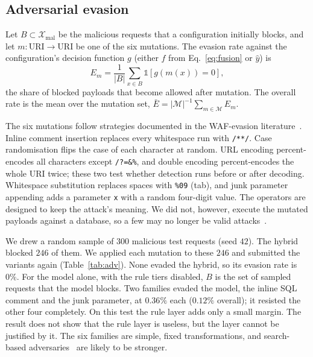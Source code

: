 \documentclass[preprint,11pt]{elsarticle}
\begin{document}
\subsection{Adversarial evasion}
Let $B\subset\mathcal{X}_{\text{mal}}$ be the malicious requests that a
configuration initially blocks, and let $m:\text{URI}\to\text{URI}$ be one
of the six mutations. The evasion rate against the configuration's decision
function $g$ (either $f$ from Eq.~\eqref{eq:fusion} or $\hat y$) is
\begin{equation}
E_m = \frac{1}{|B|}\sum_{x\in B} \mathbb{1}[g(m(x))=0],
\label{eq:evasion}
\end{equation}
the share of blocked payloads that become allowed after mutation. The
overall rate is the mean over the mutation set,
$\bar E=|\mathcal{M}|^{-1}\sum_{m\in\mathcal{M}}E_m$.

The six mutations follow strategies documented in the WAF-evasion
literature~\cite{appelt2014mutation,demetrio2020wafamole}. Inline comment
insertion replaces every whitespace run with \texttt{/**/}. Case
randomisation flips the case of each character at random. URL encoding
percent-encodes all characters except \texttt{/?=\&\%}, and double encoding
percent-encodes the whole URI twice; these two test whether detection runs
before or after decoding. Whitespace substitution replaces spaces with
\texttt{\%09} (tab), and junk parameter appending adds a parameter
\texttt{x} with a random four-digit value. The operators are designed to
keep the attack's meaning. We did not, however, execute the mutated
payloads against a database, so a few may no longer be valid
attacks~\cite{pierazzi2020problemspace}.

We drew a random sample of $300$ malicious test requests (seed $42$). The
hybrid blocked $246$ of them. We applied each mutation to these $246$ and
submitted the variants again (Table~\ref{tab:adv}). None evaded the hybrid,
so its evasion rate is $0\%$. For the model alone, with the rule tiers
disabled, $B$ is the set of sampled requests that the model blocks. Two
families evaded the model, the inline SQL comment and the junk parameter,
at $0.36\%$ each ($0.12\%$ overall); it resisted the other four completely.
On this test the rule layer adds only a small margin. The result does not
show that the rule layer is useless, but the layer cannot be justified by
it. The six families are simple, fixed transformations, and search-based
adversaries~\cite{appelt2018evolutionary,advsqli2024} are likely to be
stronger.
\end{document}
